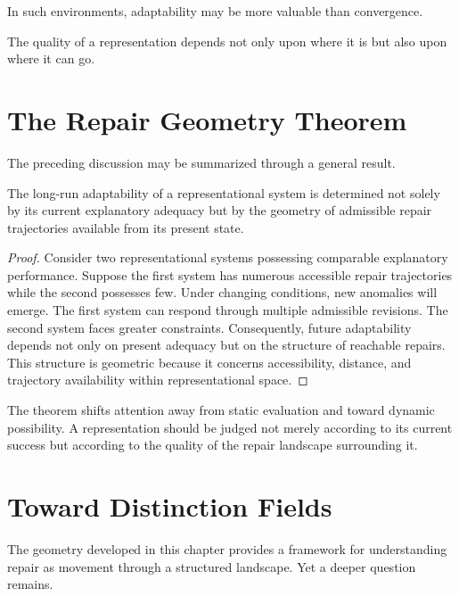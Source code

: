 \documentclass[11pt,oneside,openany]{book}
\begin{document}
In such environments, adaptability may be more valuable than convergence.

The quality of a representation depends not only upon where it is but also upon where it can go.

\section{The Repair Geometry Theorem}

The preceding discussion may be summarized through a general result.

\begin{theorem}

The long-run adaptability of a representational system is determined not solely by its current explanatory adequacy but by the geometry of admissible repair trajectories available from its present state.

\end{theorem}

\begin{proof}

Consider two representational systems possessing comparable explanatory performance. Suppose the first system has numerous accessible repair trajectories while the second possesses few. Under changing conditions, new anomalies will emerge. The first system can respond through multiple admissible revisions. The second system faces greater constraints. Consequently, future adaptability depends not only on present adequacy but on the structure of reachable repairs. This structure is geometric because it concerns accessibility, distance, and trajectory availability within representational space.

\end{proof}

The theorem shifts attention away from static evaluation and toward dynamic possibility. A representation should be judged not merely according to its current success but according to the quality of the repair landscape surrounding it.

\section{Toward Distinction Fields}

The geometry developed in this chapter provides a framework for understanding repair as movement through a structured landscape. Yet a deeper question remains.
\end{document}
